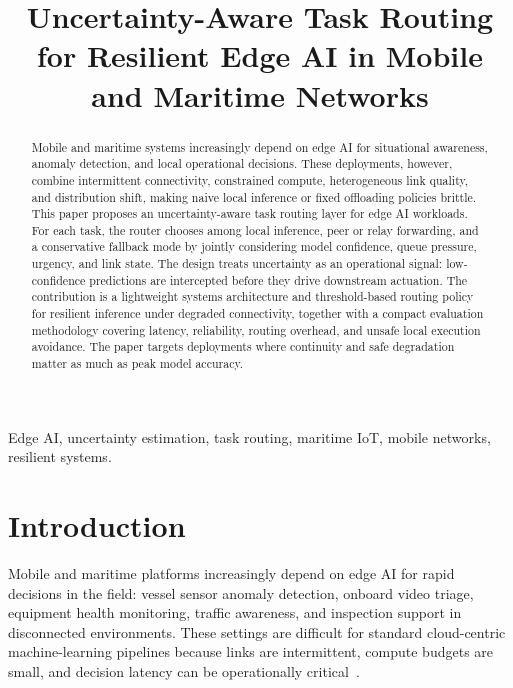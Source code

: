 \documentclass[10pt, conference]{IEEEtran}
\begin{document}
\title{Uncertainty-Aware Task Routing for Resilient Edge AI in Mobile and Maritime Networks}

\author{%
}
\maketitle

\begin{abstract}
Mobile and maritime systems increasingly depend on edge AI for situational awareness, anomaly detection, and local operational decisions. These deployments, however, combine intermittent connectivity, constrained compute, heterogeneous link quality, and distribution shift, making naive local inference or fixed offloading policies brittle. This paper proposes an uncertainty-aware task routing layer for edge AI workloads. For each task, the router chooses among local inference, peer or relay forwarding, and a conservative fallback mode by jointly considering model confidence, queue pressure, urgency, and link state. The design treats uncertainty as an operational signal: low-confidence predictions are intercepted before they drive downstream actuation. The contribution is a lightweight systems architecture and threshold-based routing policy for resilient inference under degraded connectivity, together with a compact evaluation methodology covering latency, reliability, routing overhead, and unsafe local execution avoidance. The paper targets deployments where continuity and safe degradation matter as much as peak model accuracy.
\end{abstract}

\begin{IEEEkeywords}
Edge AI, uncertainty estimation, task routing, maritime IoT, mobile networks, resilient systems.
\end{IEEEkeywords}

\section{Introduction}
Mobile and maritime platforms increasingly depend on edge AI for rapid decisions in the field: vessel sensor anomaly detection, onboard video triage, equipment health monitoring, traffic awareness, and inspection support in disconnected environments. These settings are difficult for standard cloud-centric machine-learning pipelines because links are intermittent, compute budgets are small, and decision latency can be operationally critical~\cite{shi2016edge,satyanarayanan2017emergence}.
\end{document}
